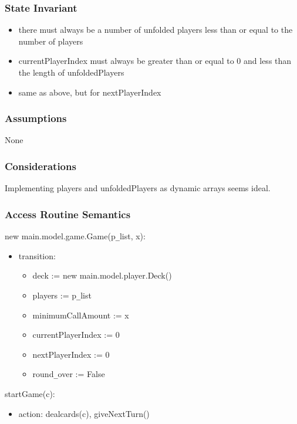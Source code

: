 \documentclass[12pt, titlepage]{article}
\begin{document}
\subsubsection* {State Invariant}

\begin{itemize}
    \item there must always be a number of unfolded players less than or equal to the number of players
    \item currentPlayerIndex must always be greater than or equal to 0 and less than the length of unfoldedPlayers
    \item same as above, but for nextPlayerIndex
\end{itemize}

\subsubsection* {Assumptions}

None

\subsubsection* {Considerations}

Implementing players and unfoldedPlayers as dynamic arrays seems ideal.

\subsubsection* {Access Routine Semantics}

\noindent new main.model.game.Game(p\verb|_|list, x):
\begin{itemize}
\item transition:
    \begin{itemize}
        \item deck := new main.model.player.Deck()
        \item players := p\verb|_|list
        \item minimumCallAmount := x
        \item currentPlayerIndex := 0
        \item nextPlayerIndex := 0
        \item round\verb|_|over := False
    \end{itemize}
\end{itemize}

\noindent startGame(c):
\begin{itemize}
\item action: dealcards(c), giveNextTurn()
\end{itemize}
\end{document}
